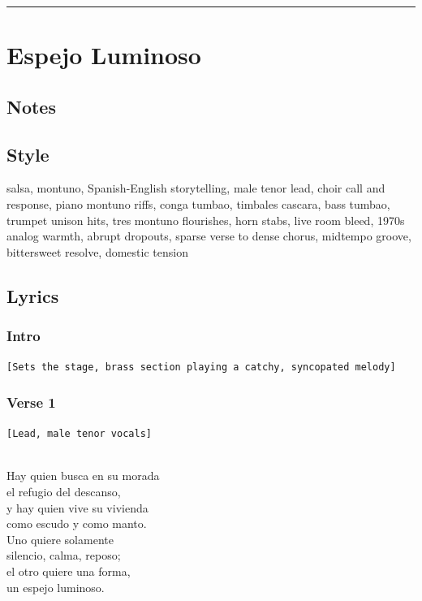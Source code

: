 \begin{center}\rule{0.5\linewidth}{0.5pt}\end{center}

\section{Espejo Luminoso}\label{espejo-luminoso}

\subsection{Notes}\label{notes-33}

\subsection{Style}\label{style-32}

salsa, montuno, Spanish-English storytelling, male tenor lead, choir
call and response, piano montuno riffs, conga tumbao, timbales cascara,
bass tumbao, trumpet unison hits, tres montuno flourishes, horn stabs,
live room bleed, 1970s analog warmth, abrupt dropouts, sparse verse to
dense chorus, midtempo groove, bittersweet resolve, domestic tension

\subsection{Lyrics}\label{lyrics-32}

\subsubsection{Intro}\label{intro-3}

\texttt{{[}Sets\ the\ stage,\ brass\ section\ playing\ a\ catchy,\ syncopated\ melody{]}}

\subsubsection{Verse 1}\label{verse-1-27}

\texttt{{[}Lead,\ male\ tenor\ vocals{]}}\strut \\
Hay quien busca en su morada\\
el refugio del descanso,\\
y hay quien vive su vivienda\\
como escudo y como manto.\\
Uno quiere solamente\\
silencio, calma, reposo;\\
el otro quiere una forma,\\
un espejo luminoso.

